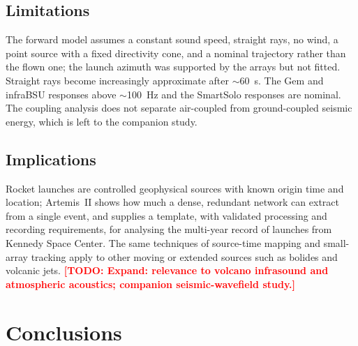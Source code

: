 \documentclass[]{seismica}
\newcommand{\todo}[1]{\textcolor{red}{\textbf{[TODO: #1]}}}
\begin{document}
\subsection{Limitations}

The forward model assumes a constant sound speed, straight rays, no
wind, a point source with a fixed directivity cone, and a nominal
trajectory rather than the flown one; the launch azimuth was supported
by the arrays but not fitted. Straight rays become increasingly
approximate after $\sim$60~s. The Gem and infraBSU responses above
$\sim$100~Hz and the SmartSolo responses are nominal. The coupling
analysis does not separate air-coupled from ground-coupled seismic
energy, which is left to the companion study.

\subsection{Implications}

Rocket launches are controlled geophysical sources with known origin
time and location; Artemis~II shows how much a dense, redundant network
can extract from a single event, and supplies a template, with
validated processing and recording requirements, for analysing the
multi-year record of launches from Kennedy Space Center. The same
techniques of source-time mapping and small-array tracking apply to
other moving or extended sources such as bolides and volcanic jets.
\todo{Expand: relevance to volcano infrasound and atmospheric
acoustics; companion seismic-wavefield study.}


\section{Conclusions}
\end{document}

